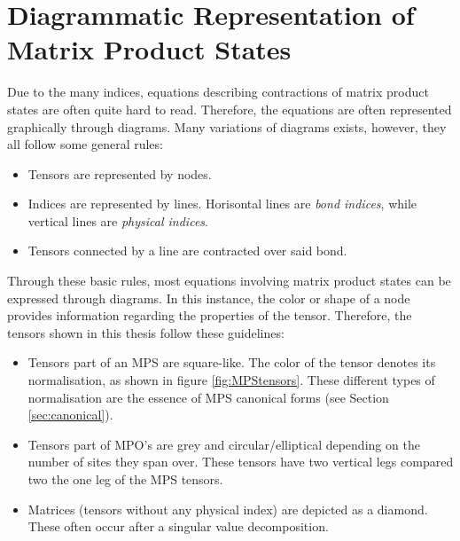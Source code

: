 \chapter{Diagrammatic Representation of Matrix Product States} \label{chap:diagrams}

Due to the many indices, equations describing contractions of matrix product states are often quite hard to read. Therefore, the equations are often represented graphically through diagrams. Many variations of diagrams exists, however, they all follow some general rules:
\begin{itemize}
\item
Tensors are represented by nodes.
\item
Indices are represented by lines. Horisontal lines are \textit{bond indices}, while vertical lines are \textit{physical indices}.
\item
Tensors connected by a line are contracted over said bond.
\end{itemize}
Through these basic rules, most equations involving matrix product states can be expressed through diagrams. In this instance, the color or shape of a node provides information regarding the properties of the tensor. Therefore, the tensors shown in this thesis follow these guidelines:
\begin{itemize}
\item
Tensors part of an MPS are square-like. The color of the tensor denotes its normalisation, as shown in figure \ref{fig:MPStensors}. These different types of normalisation are the essence of MPS canonical forms (see Section \ref{sec:canonical}).
\item
Tensors part of MPO's are grey and circular/elliptical depending on the number of sites they span over. These tensors have two vertical legs compared two the one leg of the MPS tensors.
\item
Matrices (tensors without any physical index) are depicted as a diamond. These often occur after a singular value decomposition. 
\end{itemize} 


